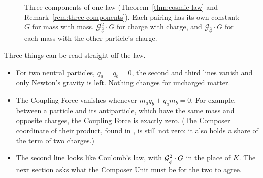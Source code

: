 \begin{figure}[tb]
\myfloatalign
{}
\caption[Three components of one law]{Three components of one law (Theorem~\ref{thm:cosmic-law} and Remark~\ref{rem:three-components}). Each pairing has its own constant: $G$ for mass with mass, $\mathcal{G}_{\bar{\phi}}^2 \cdot G$ for charge with charge, and $\mathcal{G}_{\bar{\phi}} \cdot G$ for each mass with the other particle's charge.}
\label{fig:three-components}
\end{figure}

\begin{plainwords}
Three things can be read straight off the law.
\begin{itemize}
  \item For two neutral particles, $q_a = q_b = 0$, the second and third lines vanish and only Newton's gravity is left. Nothing changes for uncharged matter.
  \item The Coupling Force vanishes whenever $m_a q_b + q_a m_b = 0$. For example, between a particle and its antiparticle, which have the same mass and opposite charges, the Coupling Force is exactly zero. (The Composer coordinate of their product, found in , is still not zero: it also holds a share of the term of two charges.)
  \item The second line looks like Coulomb's law, with $\mathcal{G}_{\bar{\phi}}^2 \cdot G$ in the place of $K$. The next section asks what the Composer Unit must be for the two to agree.
\end{itemize}
\end{plainwords}

